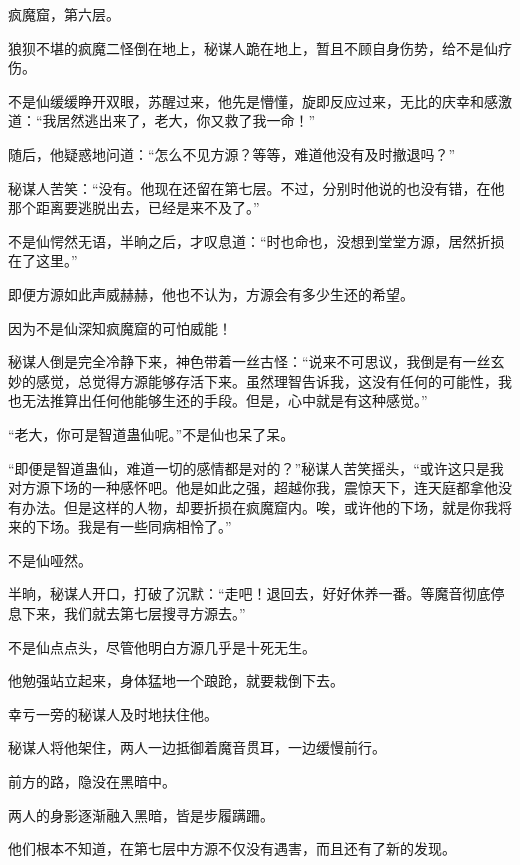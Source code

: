 
\begin{this_body}



疯魔窟，第六层。

狼狈不堪的疯魔二怪倒在地上，秘谋人跪在地上，暂且不顾自身伤势，给不是仙疗伤。

不是仙缓缓睁开双眼，苏醒过来，他先是懵懂，旋即反应过来，无比的庆幸和感激道：“我居然逃出来了，老大，你又救了我一命！”

随后，他疑惑地问道：“怎么不见方源？等等，难道他没有及时撤退吗？”

秘谋人苦笑：“没有。他现在还留在第七层。不过，分别时他说的也没有错，在他那个距离要逃脱出去，已经是来不及了。”

不是仙愕然无语，半晌之后，才叹息道：“时也命也，没想到堂堂方源，居然折损在了这里。”

即便方源如此声威赫赫，他也不认为，方源会有多少生还的希望。

因为不是仙深知疯魔窟的可怕威能！

秘谋人倒是完全冷静下来，神色带着一丝古怪：“说来不可思议，我倒是有一丝玄妙的感觉，总觉得方源能够存活下来。虽然理智告诉我，这没有任何的可能性，我也无法推算出任何他能够生还的手段。但是，心中就是有这种感觉。”

“老大，你可是智道蛊仙呢。”不是仙也呆了呆。

“即便是智道蛊仙，难道一切的感情都是对的？”秘谋人苦笑摇头，“或许这只是我对方源下场的一种感怀吧。他是如此之强，超越你我，震惊天下，连天庭都拿他没有办法。但是这样的人物，却要折损在疯魔窟内。唉，或许他的下场，就是你我将来的下场。我是有一些同病相怜了。”

不是仙哑然。

半晌，秘谋人开口，打破了沉默：“走吧！退回去，好好休养一番。等魔音彻底停息下来，我们就去第七层搜寻方源去。”

不是仙点点头，尽管他明白方源几乎是十死无生。

他勉强站立起来，身体猛地一个踉跄，就要栽倒下去。

幸亏一旁的秘谋人及时地扶住他。

秘谋人将他架住，两人一边抵御着魔音贯耳，一边缓慢前行。

前方的路，隐没在黑暗中。

两人的身影逐渐融入黑暗，皆是步履蹒跚。

他们根本不知道，在第七层中方源不仅没有遇害，而且还有了新的发现。


\end{this_body}
